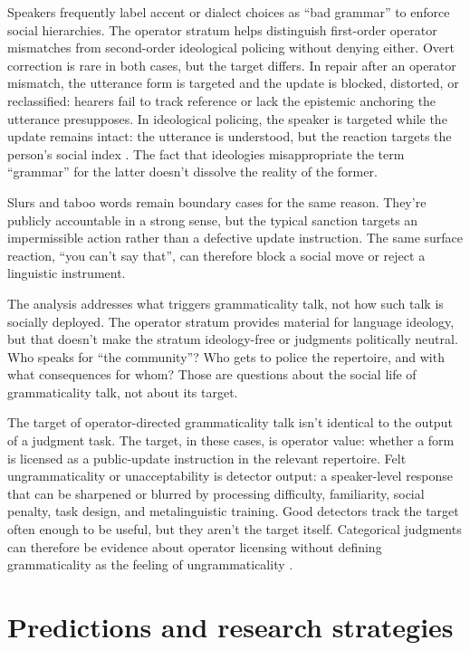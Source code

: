 \documentclass[12pt,letterpaper]{article}
\begin{document}
Speakers frequently label accent or dialect choices as \enquote{bad grammar} to enforce social hierarchies. The operator stratum helps distinguish first-order operator mismatches from second-order ideological policing without denying either. Overt correction is rare in both cases, but the target differs. In repair after an operator mismatch, the utterance form is targeted and the update is blocked, distorted, or reclassified: hearers fail to track reference or lack the epistemic anchoring the utterance presupposes. In ideological policing, the speaker is targeted while the update remains intact: the utterance is understood, but the reaction targets the person's social index \citep{agha2007,eckert2012}. The fact that ideologies misappropriate the term \enquote{grammar} for the latter doesn't dissolve the reality of the former.

Slurs and taboo words remain boundary cases for the same reason. They're publicly accountable in a strong sense, but the typical sanction targets an impermissible action rather than a defective update instruction. The same surface reaction, \enquote{you can't say that}, can therefore block a social move or reject a linguistic instrument.

The analysis addresses what triggers grammaticality talk, not how such talk is socially deployed. The operator stratum provides material for language ideology, but that doesn't make the stratum ideology-free or judgments politically neutral. Who speaks for \enquote{the community}? Who gets to police the repertoire, and with what consequences for whom? Those are questions about the social life of grammaticality talk, not about its target.

The target of operator-directed grammaticality talk isn't identical to the output of a judgment task. The target, in these cases, is operator value: whether a form is licensed as a public-update instruction in the relevant repertoire. Felt ungrammaticality or unacceptability is detector output: a speaker-level response that can be sharpened or blurred by processing difficulty, familiarity, social penalty, task design, and metalinguistic training. Good detectors track the target often enough to be useful, but they aren't the target itself. Categorical judgments can therefore be evidence about operator licensing without defining grammaticality as the feeling of ungrammaticality \citep{author2026grammaticality}.

\section{Predictions and research strategies}
\end{document}
